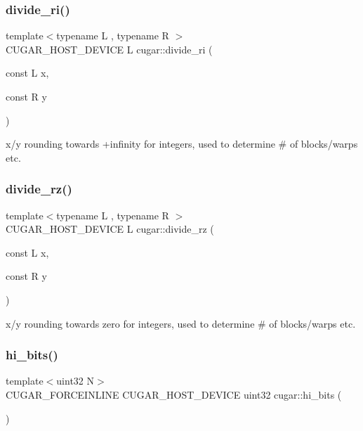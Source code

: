 \subsubsection{\texorpdfstring{divide\+\_\+ri()}{divide\_ri()}}
{\footnotesize\ttfamily template$<$typename L , typename R $>$ \\
C\+U\+G\+A\+R\+\_\+\+H\+O\+S\+T\+\_\+\+D\+E\+V\+I\+CE L cugar\+::divide\+\_\+ri (\begin{DoxyParamCaption}\item[{const L}]{x,  }\item[{const R}]{y }\end{DoxyParamCaption})\hspace{0.3cm}{\ttfamily [inline]}}

x/y rounding towards +infinity for integers, used to determine \# of blocks/warps etc. \mbox{\label{group___basic_utils_gae5973146d12ab34b3cdf518c2ea0d14b}} 
\subsubsection{\texorpdfstring{divide\+\_\+rz()}{divide\_rz()}}
{\footnotesize\ttfamily template$<$typename L , typename R $>$ \\
C\+U\+G\+A\+R\+\_\+\+H\+O\+S\+T\+\_\+\+D\+E\+V\+I\+CE L cugar\+::divide\+\_\+rz (\begin{DoxyParamCaption}\item[{const L}]{x,  }\item[{const R}]{y }\end{DoxyParamCaption})\hspace{0.3cm}{\ttfamily [inline]}}

x/y rounding towards zero for integers, used to determine \# of blocks/warps etc. \mbox{\label{group___basic_utils_ga47492a6dcbe7be467ffda1dd9ad48fb8}} 
\subsubsection{\texorpdfstring{hi\+\_\+bits()}{hi\_bits()}}
{\footnotesize\ttfamily template$<$uint32 N$>$ \\
C\+U\+G\+A\+R\+\_\+\+F\+O\+R\+C\+E\+I\+N\+L\+I\+NE C\+U\+G\+A\+R\+\_\+\+H\+O\+S\+T\+\_\+\+D\+E\+V\+I\+CE uint32 cugar\+::hi\+\_\+bits (\begin{DoxyParamCaption}{ }\end{DoxyParamCaption})}

